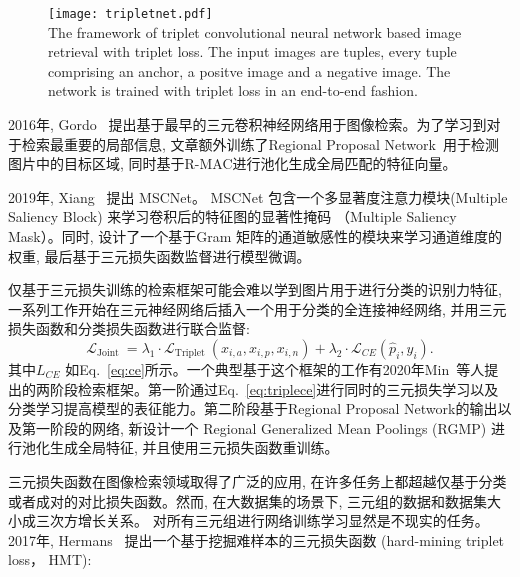 \begin{figure}[!htp]
    \centering
    \texttt{[image: tripletnet.pdf]} \\
      {The framework of triplet convolutional neural network based image retrieval with triplet loss. The input images are tuples, every tuple comprising an anchor, a positve image and a negative image. The network is trained with triplet loss in an end-to-end fashion.}
   \label{fig:tripletnet}
\end{figure}
2016年, Gordo~\cite{gordo2016deep, gordo2017end} 提出基于最早的三元卷积神经网络用于图像检索。为了学习到对于检索最重要的局部信息, 文章额外训练了Regional Proposal Network~\cite{ren2015faster}用于检测图片中的目标区域, 同时基于R-MAC进行池化生成全局匹配的特征向量。\par
2019年, Xiang~\cite{xiang2019multiple} 提出 MSCNet。 MSCNet 包含一个多显著度注意力模块(Multiple Saliency Block) 来学习卷积后的特征图的显著性掩码 （Multiple Saliency Mask）。同时, 设计了一个基于Gram 矩阵的通道敏感性的模块来学习通道维度的权重, 最后基于三元损失函数监督进行模型微调。\par
仅基于三元损失训练的检索框架可能会难以学到图片用于进行分类的识别力特征, 一系列工作开始在三元神经网络后插入一个用于分类的全连接神经网络, 并用三元损失函数和分类损失函数进行联合监督:
\begin{equation}
    \mathcal{L}_{\text {Joint }}=\lambda_1 \cdot \mathcal{L}_{\text {Triplet }}\left(x_{i, a}, x_{i, p}, x_{i, n}\right)+\lambda_2 \cdot \mathcal{L}_{C E}\left(\hat{p}_i, y_i\right).
    \label{eq:triplece}
\end{equation}
其中$L_{CE}$ 如Eq.~\ref{eq:ce}所示。一个典型基于这个框架的工作有2020年Min~\cite{min2020two}等人提出的两阶段检索框架。第一阶通过Eq.~\ref{eq:triplece}进行同时的三元损失学习以及分类学习提高模型的表征能力。第二阶段基于Regional Proposal Network的输出以及第一阶段的网络, 新设计一个 Regional Generalized Mean Poolings (RGMP) 进行池化生成全局特征, 并且使用三元损失函数重训练。\par
三元损失函数在图像检索领域取得了广泛的应用, 在许多任务上都超越仅基于分类或者成对的对比损失函数。然而, 在大数据集的场景下, 三元组的数据和数据集大小成三次方增长关系。 对所有三元组进行网络训练学习显然是不现实的任务。 2017年, Hermans~\cite{hermans2017defense} 提出一个基于挖掘难样本的三元损失函数 (hard-mining triplet loss， HMT):
